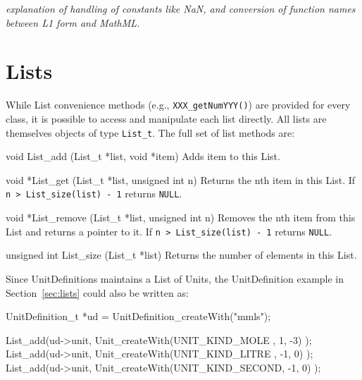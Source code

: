 \documentclass{cekmanual}
\begin{document}
\emph{explanation of handling of constants like NaN, and conversion of
  function names between L1 form and MathML.}




\clearpage
\appendix
\section{Lists}
\label{app:lists}

While List convenience methods (e.g., \texttt{XXX\_getNumYYY()}) are
provided for every class, it is possible to access and manipulate each
list directly.  All lists are themselves objects of type
\texttt{List\_t}.  The full set of list methods are:


\begin{methoddef}{void List\_add (List\_t *list, void *item)}
  Adds item to this List.
\end{methoddef}

\begin{methoddef}{void *List\_get (List\_t *list, unsigned int n)}
  Returns the nth item in this List.  If \texttt{n > List\_size(list)
  - 1} returns \texttt{NULL}.
\end{methoddef}

\begin{methoddef}{void *List\_remove (List\_t *list, unsigned int n)}
  Removes the nth item from this List and returns a pointer to it.  If
  \texttt{n > List\_size(list) - 1} returns \texttt{NULL}.
\end{methoddef}

\begin{methoddef}{unsigned int List\_size (List\_t *list)}
  Returns the number of elements in this List.
\end{methoddef}


Since UnitDefinitions maintains a List of Units, the UnitDefinition
example in Section~\ref{sec:lists} could also be written as:


\begin{example}[c]
UnitDefinition_t *ud = UnitDefinition_createWith("mmls");

List_add(ud->unit, Unit_createWith(UNIT_KIND_MOLE  ,  1, -3) );
List_add(ud->unit, Unit_createWith(UNIT_KIND_LITRE , -1,  0) );
List_add(ud->unit, Unit_createWith(UNIT_KIND_SECOND, -1,  0) );
\end{example}
\end{document}
